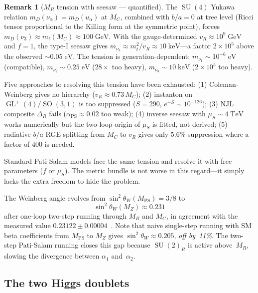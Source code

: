 \documentclass[12pt,a4paper]{article}
\theoremstyle{definition}
\newtheorem{remark}[theorem]{Remark}
\newcommand{\GL}{\operatorname{GL}}
\newcommand{\SO}{\operatorname{SO}}
\newcommand{\SU}{\operatorname{SU}}
\newcommand{\MPS}{M_{\mathrm{PS}}}
\begin{document}
\begin{remark}[$M_R$ tension with seesaw --- quantified]
\label{rem:MR_tension}
The $\SU(4)$ Yukawa relation $m_D(\nu_\alpha) = m_D(u_\alpha)$ at $M_C$, combined with $b/a = 0$ at tree level (Ricci tensor proportional to the Killing form at the symmetric point), forces $m_D(\nu_3) \approx m_t(M_C) \approx 100\;\mathrm{GeV}$.
With the gauge-determined $v_R \approx 10^9\;\mathrm{GeV}$ and $f = 1$, the type-I seesaw gives $m_{\nu_3} \approx m_t^2/v_R \approx 10\;\mathrm{keV}$---a factor $2 \times 10^5$ above the observed $\sim 0.05\;\mathrm{eV}$.
The tension is generation-dependent: $m_{\nu_1} \sim 10^{-6}\;\mathrm{eV}$ (compatible), $m_{\nu_2} \sim 0.25\;\mathrm{eV}$ ($28\times$ too heavy), $m_{\nu_3} \sim 10\;\mathrm{keV}$ ($2 \times 10^5$ too heavy).

Five approaches to resolving this tension have been exhausted:
(1) Coleman-Weinberg gives no hierarchy ($v_R \approx 0.73\, M_C$);
(2) instanton on $\GL^+(4)/\SO(3,1)$ is too suppressed ($S = 290$, $e^{-S} \sim 10^{-126}$);
(3) NJL composite $\Delta_R$ fails ($\alpha_{\mathrm{PS}} \approx 0.02$ too weak);
(4) inverse seesaw with $\mu_S \sim 4\;\mathrm{TeV}$ works numerically but the two-loop origin of $\mu_S$ is fitted, not derived;
(5) radiative $b/a$ RGE splitting from $M_C$ to $v_R$ gives only $5.6\%$ suppression where a factor of $400$ is needed.

Standard Pati-Salam models face the same tension and resolve it with free parameters ($f$ or $\mu_S$).
The metric bundle is not worse in this regard---it simply lacks the extra freedom to hide the problem.
\end{remark}

The Weinberg angle evolves from $\sin^2\theta_W(\MPS) = 3/8$ to
\begin{equation}
\label{eq:weinberg}
\boxed{\sin^2\theta_W(M_Z) \approx 0.231}
\end{equation}
after one-loop two-step running through $M_R$ and $M_C$, in agreement with the measured value $0.23122 \pm 0.00004$~\cite{PDG2024}.
Note that naive single-step running with SM beta coefficients from $\MPS$ to $M_Z$ gives $\sin^2\theta_W \approx 0.205$, \emph{off by~11\%}.
The two-step Pati-Salam running closes this gap because $\SU(2)_R$ is active above~$M_R$, slowing the divergence between $\alpha_1$ and~$\alpha_2$.

\subsection{The two Higgs doublets}
\end{document}

